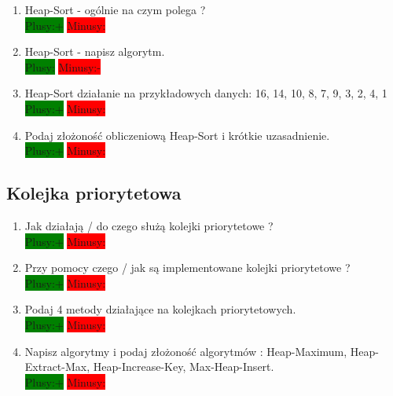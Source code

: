 \documentclass[a4paper,11pt]{article}
\begin{document}
\begin{enumerate}
\item Heap-Sort - ogólnie na czym polega ?\\  
\colorbox{green}{Plusy:+} \colorbox{red}{Minusy: }

\item Heap-Sort - napisz algorytm.\\  
\colorbox{green}{Plusy:} \colorbox{red}{Minusy:- }

\item Heap-Sort działanie na przykładowych danych: 16, 14, 10, 8, 7, 9, 3, 2, 4, 1\\  
\colorbox{green}{Plusy:+} \colorbox{red}{Minusy: }

\item Podaj złożoność obliczeniową Heap-Sort i krótkie uzasadnienie. \\  
\colorbox{green}{Plusy:+} \colorbox{red}{Minusy: }
\end{enumerate}
\subsection{Kolejka priorytetowa}
\begin{enumerate}
\item Jak działają / do czego służą kolejki priorytetowe ? \\  \colorbox{green}{Plusy:+} \colorbox{red}{Minusy: }

\item Przy pomocy czego / jak są implementowane kolejki priorytetowe ?\\  
\colorbox{green}{Plusy:+} \colorbox{red}{Minusy: }

\item Podaj 4 metody działające na kolejkach priorytetowych.\\  \colorbox{green}{Plusy:+} \colorbox{red}{Minusy: }

\item Napisz algorytmy i podaj złożoność algorytmów : Heap-Maximum, Heap-Extract-Max, Heap-Increase-Key, Max-Heap-Insert. \\  \colorbox{green}{Plusy:+} \colorbox{red}{Minusy: }

\end{enumerate}
\end{document}
